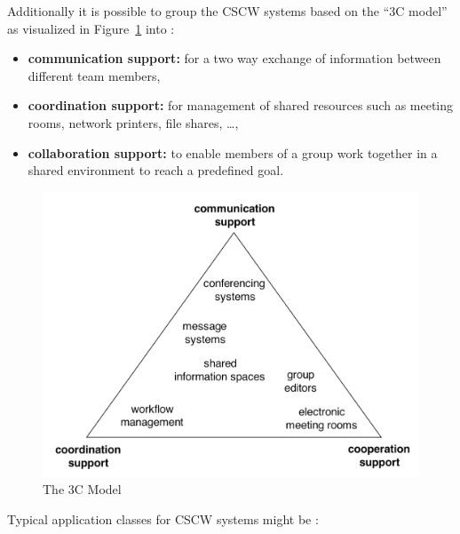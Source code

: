 Additionally it is possible to group the \gls{CSCW} systems based on the ``3C model'' as visualized in Figure~\ref{fig:images_cscw_3C_model} into \citep[pg. 125]{borghoff2000computer}:

\begin{itemize}
  \item \textbf{communication support:} for a two way exchange of information between different team members,
  \item \textbf{coordination support:} for management of shared resources such as meeting rooms, network printers, file shares, \ldots,
  \item \textbf{collaboration support:} to enable members of a group work together in a shared environment to reach a predefined goal.
\end{itemize}

\begin{figure}[H]
 \centering
 \includegraphics[width=0.9\columnwidth]{images/3C-model.png}
 \caption[The 3C Model]{The 3C Model \citep{Koch2008}}
\label{fig:images_cscw_3C_model}
\end{figure}

Typical application classes for \gls{CSCW} systems might be \citep[pg. 119-120]{borghoff2000computer}: \@

